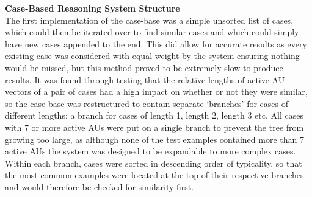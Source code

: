 \documentclass[a4paper]{article}
\begin{document}
{\bf Case-Based Reasoning System Structure}\\
The first implementation of the case-base was a simple unsorted list of cases, which could then be iterated over to find similar cases and
which could simply have new cases appended to the end. This did allow for accurate results as every existing case was considered with equal
weight by the system ensuring nothing would be missed, but this method proved to be extremely slow to produce results. It was found through
testing that the relative lengths of active AU vectors of a pair of cases had a high impact on whether or not they were similar, so the case-base was
restructured to contain separate `branches' for cases of different lengths; a branch for cases of length 1, length 2, length 3 etc. All cases
with 7 or more active AUs were put on a single branch to prevent the tree from growing too large, as although none of the test examples contained
more than 7 active AUs the system was designed to be expandable to more complex cases. Within each branch, cases were sorted in descending order
of typicality, so that the most common examples were located at the top of their respective branches and would therefore be checked for similarity
first.\\
\end{document}
